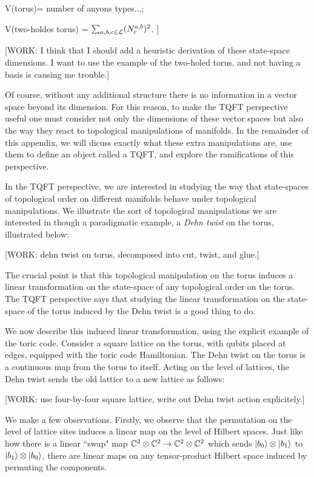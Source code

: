 V(torus)= number of anyons types...;

V(two-holdes torus) = $\sum_{a,b,c\in {\mathcal L}}(N^{a,b}_c)^2$.
]

[WORK: I think that I should add a heuristic derivation of these state-space dimensions. I want to use the example of the two-holed torus, and not having a basis is causing me trouble.]

Of course, without any additional structure there is no information in a vector space beyond its dimension. For this reason, to make the TQFT perspective useful one must consider not only the dimensions of these vector spaces but also the way they react to topological manipulations of manifolds. In the remainder of this appendix, we will dicuss exactly what these extra manipulations are, use them to define an object called a TQFT, and explore the ramifications of this perspective.

In the TQFT perspective, we are interested in studying the way that state-spaces of topological order on different manifolds behave under topological manipulations. We illustrate the sort of topological manipulations we are interested in though a paradigmatic example, a \textit{Dehn twist} on the torus, illustrated below:

[WORK: dehn twist on torus, decomposed into cut, twist, and glue.]

The crucial point is that this topological manipulation on the torus induces a linear transformation on the state-space of any topological order on the torus. The TQFT perspective says that studying the linear transformation on the state-space of the torus induced by the Dehn twist is a good thing to do.

We now describe this induced linear transformation, using the explicit example of the toric code. Consider a square lattice on the torus, with qubits placed at edges, equipped with the toric code Hamiltonian. The Dehn twist on the torus is a continuous map from the torus to itself. Acting on the level of lattices, the Dehn twist sends the old lattice to a new lattice as follows:

[WORK: use four-by-four square lattice, write out Dehn twist action explicitely.]

We make a few observations. Firstly, we observe that the permutation on the level of lattice sites induces a linear map on the level of Hilbert spaces. Just like how there is a linear ``swap" map ${\mathbb C}^2\otimes {\mathbb C}^2\to {\mathbb C}^2\otimes {\mathbb C}^2$ which sends $\ket{b_0}\otimes \ket{b_1}$ to $\ket{b_1}\otimes \ket{b_0}$, there are linear maps on any tensor-product Hilbert space induced by permuting the components.

